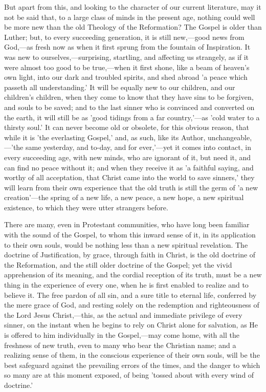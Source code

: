 \documentclass[
]{book}
\begin{document}
But apart from this, and looking to the character of our current literature, may it not be said that, to a large class of minds in the present age, nothing could well be more new than the old Theology of the Reformation? The Gospel is older than Luther; but, to every succeeding generation, it is still new,---good news from God,---as fresh now as when it first sprung from the fountain of Inspiration. It was new to ourselves,---surprising, startling, and affecting us strangely, as if it were almost too good to be true,---when it first shone, like a beam of heaven's own light, into our dark and troubled spirits, and shed abroad 'a peace which passeth all understanding.' It will be equally new to our children, and our children's children, when they come to know that they have sins to be forgiven, and souls to be saved; and to the last sinner who is convinced and converted on the earth, it will still be as 'good tidings from a far country,'---as 'cold water to a thirsty soul.' It can never become old or obsolete, for this obvious reason, that while it is 'the everlasting Gospel,' and, as such, like its Author, unchangeable,---'the same yesterday, and to-day, and for ever,'---yet it comes into contact, in every succeeding age, with new minds, who are ignorant of it, but need it, and can find no peace without it; and when they receive it as 'a faithful saying, and worthy of all acceptation, that Christ came into the world to save sinners,' they will learn from their own experience that the old truth is still the germ of 'a new creation'---the spring of a new life, a new peace, a new hope, a new spiritual existence, to which they were utter strangers before.

There are many, even in Protestant communities, who have long been familiar with the sound of the Gospel, to whom this inward sense of it, in its application to their own souls, would be nothing less than a new spiritual revelation. The doctrine of Justification, by grace, through faith in Christ, is the old doctrine of the Reformation, and the still older doctrine of the Gospel; yet the vivid apprehension of its meaning, and the cordial reception of its truth, must be a new thing in the experience of every one, when he is first enabled to realize and to believe it. The free pardon of all sin, and a sure title to eternal life, conferred by the mere grace of God, and resting solely on the redemption and righteousness of the Lord Jesus Christ,---this, as the actual and immediate privilege of every sinner, on the instant when he begins to rely on Christ alone for salvation, as He is offered to him individually in the Gospel,---may come home, with all the freshness of new truth, even to many who bear the Christian name; and a realizing sense of them, in the conscious experience of their own souls, will be the best safeguard against the prevailing errors of the times, and the danger to which so many are at this moment exposed, of being 'tossed about with every wind of doctrine.'
\end{document}
